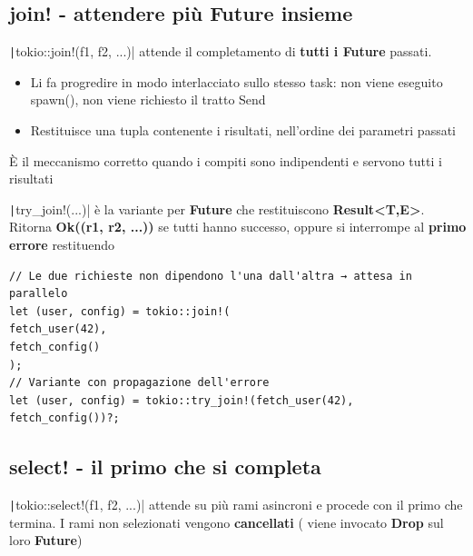 

\subsection{join! - attendere più Future insieme}


\texttt|tokio::join!(f1, f2, ...)| attende il completamento di
\textbf{tutti i Future} passati.


\begin{itemize}
  \item Li fa progredire in modo interlacciato sullo stesso task: non viene eseguito spawn(), non viene richiesto il tratto Send
  \item Restituisce una tupla contenente i risultati, nell'ordine dei parametri passati
\end{itemize}

È il meccanismo corretto quando i compiti sono indipendenti e servono tutti i risultati

\texttt|try_join!(...)| è la variante per \textbf{Future} che restituiscono
\textbf{Result<T,E>}.
Ritorna \textbf{Ok((r1, r2, ...))} se tutti hanno successo, oppure si interrompe al
\textbf{primo errore} restituendo

\begin{verbatim}
// Le due richieste non dipendono l'una dall'altra → attesa in parallelo
let (user, config) = tokio::join!(
fetch_user(42),
fetch_config()
);
// Variante con propagazione dell'errore
let (user, config) = tokio::try_join!(fetch_user(42), fetch_config())?;
\end{verbatim}


\subsection{select! - il primo che si completa}

\texttt|tokio::select!(f1, f2, ...)| attende su più rami asincroni e procede con il
primo che termina. I rami non selezionati vengono \textbf{cancellati} ( viene invocato \textbf{Drop} sul loro \textbf{Future})

